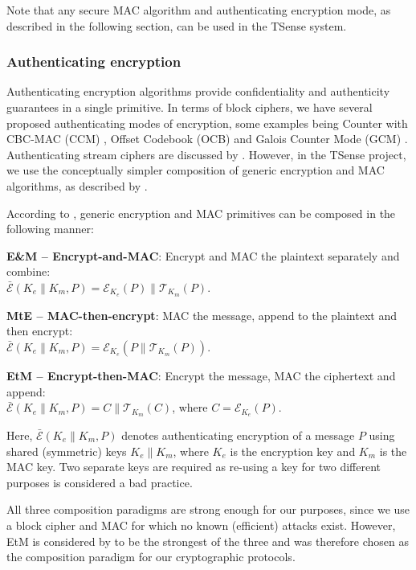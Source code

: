 Note that any secure MAC algorithm and authenticating encryption mode, as described in the following section, can be used in the TSense system.

\subsubsection{Authenticating encryption}
\label{sec:authenc}

Authenticating encryption algorithms provide confidentiality and authenticity guarantees in a single primitive. In terms of block ciphers, we have several proposed authenticating modes of encryption, some examples being Counter with CBC-MAC (CCM) , Offset Codebook (OCB)  and Galois Counter Mode (GCM) . Authenticating stream ciphers are discussed by . However, in the TSense project, we use the conceptually simpler composition of generic encryption and MAC algorithms, as described by .

According to , generic encryption and MAC primitives can be composed in the following manner:
%
\begin{description}
\item \textbf{E\&M -- Encrypt-and-MAC}: Encrypt and MAC the plaintext separately and combine:\\ $\bar{\mathcal{E}}(K_e \parallel K_m,P) = \mathcal{E}_{K_e}(P) \parallel \mathcal{T}_{K_m}(P)$.
\item \textbf{MtE -- MAC-then-encrypt}: MAC the message, append to the plaintext and then encrypt:\\ $\bar{\mathcal{E}}(K_e \parallel K_m,P) =\mathcal{E}_{K_e}(P \parallel \mathcal{T}_{K_m}(P))$.
\item \textbf{EtM -- Encrypt-then-MAC}: Encrypt the message, MAC the ciphertext and append:\\ $\bar{\mathcal{E}}(K_e \parallel K_m,P) = C \parallel \mathcal{T}_{K_m}(C)$, where $C=\mathcal{E}_{K_e}(P)$.
\end{description}
%
Here, $\bar{\mathcal{E}}(K_e \parallel K_m,P)$ denotes authenticating encryption of a message $P$ using shared (symmetric) keys $K_e \parallel K_m$, where $K_e$ is the encryption key and $K_m$ is the MAC key. Two separate keys are required as re-using a key for two different purposes is considered a bad practice.

All three composition paradigms are strong enough for our purposes, since we use a block cipher and MAC for which no known (efficient) attacks exist. However, EtM is considered by \citeauthor{bellare2007} to be the strongest of the three and was therefore chosen as the composition paradigm for our cryptographic protocols.

